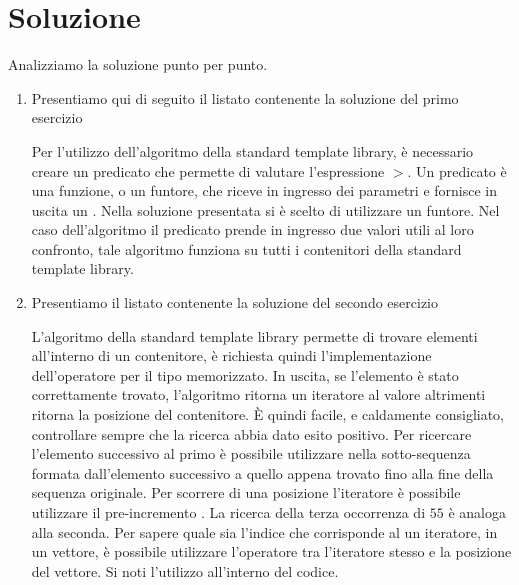 \newpage

\section*{Soluzione}

Analizziamo la soluzione punto per punto.

\begin{enumerate}
	\item Presentiamo qui di seguito il listato contenente la soluzione del primo esercizio
		\lstset{basicstyle=\scriptsize\sf}
		
		\lstset{basicstyle=\sf}
		Per l'utilizzo dell'algoritmo  della standard template library, \`e necessario creare un
		predicato che permette di valutare l'espressione $>$. Un predicato \`e una funzione, o un funtore,
		che riceve in ingresso dei parametri e fornisce in uscita un . Nella soluzione
		presentata si \`e scelto di utilizzare un funtore. Nel caso dell'algoritmo
		 il predicato prende in ingresso due valori utili al loro confronto, tale algoritmo
		funziona su tutti i contenitori della standard template library.
	
	\item Presentiamo il listato contenente la soluzione del secondo esercizio
		\lstset{basicstyle=\scriptsize\sf}
		
		\lstset{basicstyle=\sf}
		L'algoritmo  della standard template library permette di trovare elementi all'interno 
		di un contenitore, \`e richiesta quindi l'implementazione dell'operatore \cpp{==} per il tipo
		memorizzato. In uscita, se l'elemento \`e stato correttamente trovato, l'algoritmo ritorna un
		iteratore al valore altrimenti ritorna la posizione  del contenitore. \`E quindi facile, 
		e caldamente consigliato, controllare sempre che la ricerca abbia dato esito positivo. Per ricercare
		l'elemento successivo al primo \`e possibile utilizzare  nella sotto-sequenza formata 
		dall'elemento successivo a quello appena trovato fino alla fine della sequenza originale. Per scorrere di una posizione
		l'iteratore \`e possibile utilizzare il pre-incremento \cpp{++}. La ricerca della terza occorrenza
		di $55$ \`e analoga alla seconda. Per sapere quale sia l'indice che corrisponde al un iteratore,
		in un vettore, \`e possibile utilizzare l'operatore \cpp{-} tra l'iteratore stesso e la posizione
		 del vettore. Si noti l'utilizzo all'interno del codice.
		

\end{enumerate}
